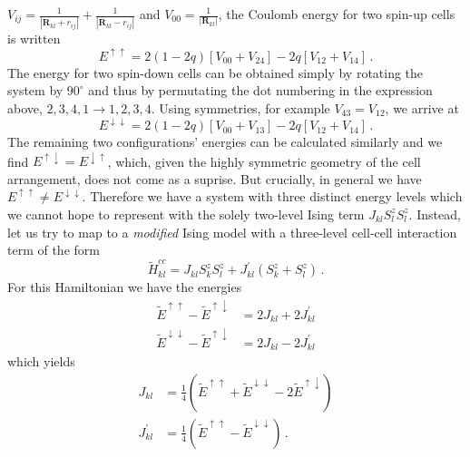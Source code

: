 $V_{ij} = \frac{1}{\left| \bm{R}_{kl} + r_{ij} \right|} + \frac{1}{\left|
\bm{R}_{kl} - r_{ij} \right|}$ and $V_{00} = \frac{1}{\left| \bm{R}_{kl}
\right|}$, the Coulomb energy for two spin-up cells is written
\begin{equation}
  \label{eq:E_upup}
  E^{\uparrow\uparrow}
  =
  2 \left( 1 - 2 q \right) \left[ V_{00} + V_{24} \right]
  - 2 q \left[ V_{12} + V_{14} \right] \, .
\end{equation}
The energy for two spin-down cells can be obtained simply by rotating the system
by $90^{\circ}$ and thus by permutating the dot numbering in the expression
above, $2,3,4,1 \rightarrow 1,2,3,4$. Using symmetries, for example $V_{43} =
V_{12}$, we arrive at
\begin{equation}
  \label{eq:E_downdown}
  E^{\downarrow\downarrow}
  =
  2 \left( 1 - 2 q \right) \left[ V_{00} + V_{13} \right]
  - 2 q \left[ V_{12} + V_{14} \right] \, .
\end{equation}
The remaining two configurations' energies can be calculated similarly and we
find $E^{\uparrow\downarrow} = E^{\downarrow\uparrow}$, which, given the highly
symmetric geometry of the cell arrangement, does not come as a suprise. But
crucially, in general we have $E^{\uparrow\uparrow} \ne
E^{\downarrow\downarrow}$. Therefore we have a system with three distinct energy
levels which we cannot hope to represent with the solely two-level Ising term
$J_{kl} S^z_l S^z_l$. Instead, let us try to map to a \emph{modified} Ising model
with a three-level cell-cell interaction term of the form
%
\begin{equation}
  \tilde{H}^{cc}_{kl}
  = 
  J_{kl} S^z_k S^z_l + 
  J^{\prime}_{kl} \left( S^z_k + S^z_l \right) \, .
\end{equation}
%
For this Hamiltonian we have the energies
%
\begin{align}
  \tilde{E}^{\uparrow\uparrow} - \tilde{E}^{\uparrow\downarrow}
  &=
  2J_{kl} + 2J^{\prime}_{kl} \\
  \tilde{E}^{\downarrow\downarrow} - \tilde{E}^{\uparrow\downarrow}
  &=
  2J_{kl} - 2J^{\prime}_{kl}
\end{align}
%
which yields
%
\begin{align}
  \label{eq:Js_from_Es}
  J_{kl}
  &=
  \frac{1}{4} 
  \left( 
    \tilde{E}^{\uparrow\uparrow} + \tilde{E}^{\downarrow\downarrow}
    - 2 \tilde{E}^{\uparrow\downarrow} 
  \right) \\
  J^{\prime}_{kl}
  &=
  \frac{1}{4}
  \left( \tilde{E}^{\uparrow\uparrow} - \tilde{E}^{\downarrow\downarrow} \right) \, .
\end{align}
